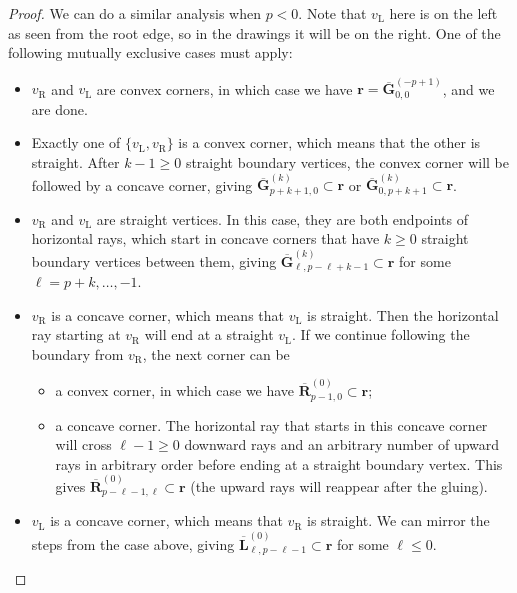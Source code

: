 \documentclass[11pt]{article}
\theoremstyle{plain}
\theoremstyle{definition}
\begin{document}
\begin{proof}
    \noindent We can do a similar analysis when $p<0$.
    Note that $v_{\mathrm{L}}$ here is on the left as seen from the root edge, so in the drawings it will be on the right.
    One of the following mutually exclusive cases must apply:
    \begin{itemize}[nosep]
        \item $v_{\mathrm{R}}$ and $v_{\mathrm{L}}$ are convex corners, in which case we have $\mathbf{r} = \overline{\mathbf{G}}^{(-p+1)}_{0,0}$, and we are done.
        \item Exactly one of $\{v_{\mathrm{L}},v_{\mathrm{R}}\}$ is a convex corner, which means that the other is straight. 
        After $k-1\geq0$ straight boundary vertices, the convex corner will be followed by a concave corner, giving $\overline{\mathbf{G}}^{(k)}_{p+k+1,0} \subset \mathbf{r}$ or $\overline{\mathbf{G}}^{(k)}_{0,p+k+1} \subset \mathbf{r}$.
        \item $v_{\mathrm{R}}$ and $v_{\mathrm{L}}$ are straight vertices. 
        In this case, they are both endpoints of horizontal rays, which start in concave corners that have $k\geq0$ straight boundary vertices between them, giving $\overline{\mathbf{G}}^{(k)}_{\ell,p-\ell+k-1}\subset \mathbf{r}$ for some $\ell=p+k,\ldots,-1$.
        \item $v_{\mathrm{R}}$ is a concave corner, which means that $v_{\mathrm{L}}$ is straight.
        Then the horizontal ray starting at $v_{\mathrm{R}}$ will end at a straight $v_{\mathrm{L}}$. 
        If we continue following the boundary from $v_{\mathrm{R}}$, the next corner can be
        \begin{itemize}
            \item a convex corner, in which case we have $\overline{\mathbf{R}}^{(0)}_{p-1,0} \subset \mathbf{r}$;
            \item a concave corner. 
            The horizontal ray that starts in this concave corner will cross $\ell-1\geq0$ downward rays and an arbitrary number of upward rays in arbitrary order before ending at a straight boundary vertex. 
            This gives $\overline{\mathbf{R}}^{(0)}_{p-\ell-1,\ell} \subset \mathbf{r}$ (the upward rays will reappear after the gluing).
        \end{itemize}
        \item $v_{\mathrm{L}}$ is a concave corner, which means that $v_{\mathrm{R}}$ is straight. We can mirror the steps from the case above, giving $\overline{\mathbf{L}}^{(0)}_{\ell,p-\ell-1} \subset \mathbf{r}$ for some $\ell\leq0$. 
    \end{itemize}
\end{proof}
\end{document}
